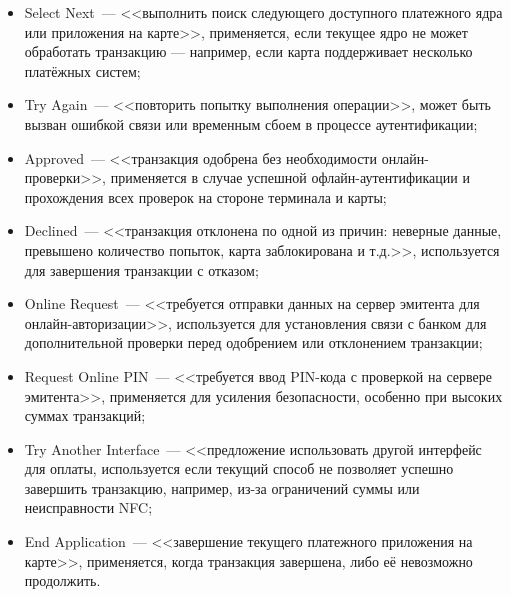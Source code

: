 \begin{itemize}
    \item Select Next~--- <<выполнить поиск следующего доступного платежного ядра или приложения на карте>>, применяется, если текущее ядро не может обработать транзакцию — например, если карта поддерживает несколько платёжных систем;
    \item Try Again~--- <<повторить попытку выполнения операции>>, может быть вызван ошибкой связи или временным сбоем в процессе аутентификации;
    \item Approved~--- <<транзакция одобрена без необходимости онлайн-проверки>>, применяется в случае успешной офлайн-аутентификации и прохождения всех проверок на стороне терминала и карты;
    \item Declined~--- <<транзакция отклонена по одной из причин: неверные данные, превышено количество попыток, карта заблокирована и т.д.>>, используется для завершения транзакции с отказом;
    \item Online Request~--- <<требуется отправки данных на сервер эмитента для онлайн-авторизации>>, используется для установления связи с банком для дополнительной проверки перед одобрением или отклонением транзакции;
    \item Request Online PIN~--- <<требуется ввод PIN-кода с проверкой на сервере эмитента>>, применяется для усиления безопасности, особенно при высоких суммах транзакций;
    \item Try Another Interface~--- <<предложение использовать другой интерфейс для оплаты, используется если текущий способ не позволяет успешно завершить транзакцию, например, из-за ограничений суммы или неисправности NFC;
    \item End Application~--- <<завершение текущего платежного приложения на карте>>, применяется, когда транзакция завершена, либо её невозможно продолжить.
\end{itemize}







